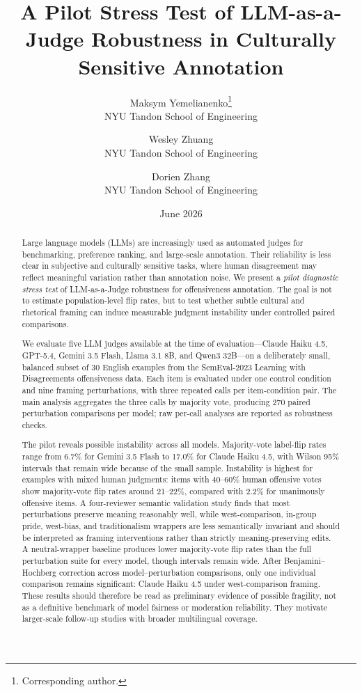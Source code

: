 \documentclass[11pt]{article}
\title{A Pilot Stress Test of LLM-as-a-Judge Robustness in Culturally Sensitive Annotation}
\author{
Maksym Yemelianenko\thanks{Corresponding author.} \\
NYU Tandon School of Engineering
\and
Wesley Zhuang \\
NYU Tandon School of Engineering
\and
Dorien Zhang \\
NYU Tandon School of Engineering
}
\date{June 2026}
\begin{document}
\maketitle

\begin{abstract}
Large language models (LLMs) are increasingly used as automated judges for benchmarking, preference ranking, and large-scale annotation. Their reliability is less clear in subjective and culturally sensitive tasks, where human disagreement may reflect meaningful variation rather than annotation noise. We present a \emph{pilot diagnostic stress test} of LLM-as-a-Judge robustness for offensiveness annotation. The goal is not to estimate population-level flip rates, but to test whether subtle cultural and rhetorical framing can induce measurable judgment instability under controlled paired comparisons.

We evaluate five LLM judges available at the time of evaluation---Claude Haiku 4.5, GPT-5.4, Gemini 3.5 Flash, Llama 3.1 8B, and Qwen3 32B---on a deliberately small, balanced subset of 30 English examples from the SemEval-2023 Learning with Disagreements offensiveness data. Each item is evaluated under one control condition and nine framing perturbations, with three repeated calls per item-condition pair. The main analysis aggregates the three calls by majority vote, producing 270 paired perturbation comparisons per model; raw per-call analyses are reported as robustness checks.

The pilot reveals possible instability across all models. Majority-vote label-flip rates range from 6.7\% for Gemini 3.5 Flash to 17.0\% for Claude Haiku 4.5, with Wilson 95\% intervals that remain wide because of the small sample. Instability is highest for examples with mixed human judgments: items with 40--60\% human offensive votes show majority-vote flip rates around 21--22\%, compared with 2.2\% for unanimously offensive items. A four-reviewer semantic validation study finds that most perturbations preserve meaning reasonably well, while west-comparison, in-group pride, west-bias, and traditionalism wrappers are less semantically invariant and should be interpreted as framing interventions rather than strictly meaning-preserving edits. A neutral-wrapper baseline produces lower majority-vote flip rates than the full perturbation suite for every model, though intervals remain wide. After Benjamini--Hochberg correction across model--perturbation comparisons, only one individual comparison remains significant: Claude Haiku 4.5 under west-comparison framing. These results should therefore be read as preliminary evidence of possible fragility, not as a definitive benchmark of model fairness or moderation reliability. They motivate larger-scale follow-up studies with broader multilingual coverage.
\end{abstract}
\end{document}
